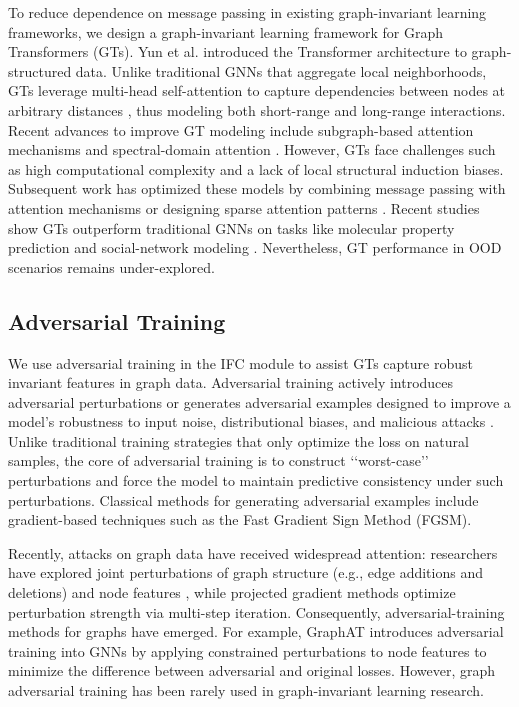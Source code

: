 \documentclass[a4paper,fleqn]{cas-dc}
\begin{document}
{\color{blue}To reduce dependence on message passing in existing graph-invariant learning frameworks, we design a graph-invariant learning framework for Graph Transformers (GTs).} Yun et al.\cite{yun2019graph} introduced the Transformer architecture \cite{vaswani2017attention} to graph-structured data. Unlike traditional GNNs that aggregate local neighborhoods, GTs leverage multi-head self-attention to capture dependencies between nodes at arbitrary distances \cite{ZHUANG2025112874,WU2025114031}, thus modeling both short-range and long-range interactions. Recent advances to improve GT modeling include subgraph-based attention mechanisms \cite{dwivedi2021generalization} and spectral-domain attention \cite{kreuzer2021rethinking}. However, GTs face challenges such as high computational complexity and a lack of local structural induction biases. Subsequent work has optimized these models by combining message passing with attention mechanisms \cite{rampavsek2022recipe} or designing sparse attention patterns \cite{shirzad2023exphormer}. Recent studies show GTs outperform traditional GNNs on tasks like molecular property prediction \cite{rampavsek2022recipe} and social-network modeling \cite{10.1145/3534678.3539296}. Nevertheless, GT performance in OOD scenarios remains under-explored.



\subsection{Adversarial Training}
We use adversarial training \cite{shafahi2019adversarial} in the IFC module to assist GTs capture robust invariant features in graph data. Adversarial training actively introduces adversarial perturbations or generates adversarial examples designed to improve a model's robustness to input noise, distributional biases, and malicious attacks \cite{DBLP:journals/corr/GoodfellowSS14}. Unlike traditional training strategies that only optimize the loss on natural samples, the core of adversarial training is to construct ‘‘worst-case’’ perturbations and force the model to maintain predictive consistency under such perturbations. Classical methods for generating adversarial examples include gradient-based techniques such as the Fast Gradient Sign Method (FGSM).

Recently, attacks on graph data have received widespread attention: researchers have explored joint perturbations of graph structure (e.g., edge additions and deletions) and node features \cite{DBLP:conf/ijcai/ZugnerAG19}, while projected gradient methods \cite{deng2020universal} optimize perturbation strength via multi-step iteration. Consequently, adversarial-training methods for graphs have emerged. For example, GraphAT \cite{feng2019graph} introduces adversarial training into GNNs by applying constrained perturbations to node features to minimize the difference between adversarial and original losses. However, graph adversarial training has been rarely used in graph-invariant learning research.
\end{document}
